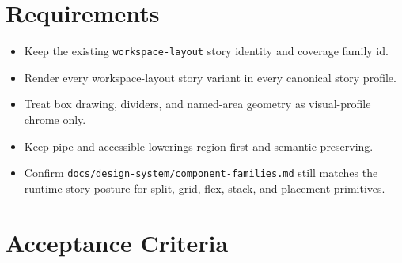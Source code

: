 \section{Requirements}\label{record-106-requirements}

\begin{itemize}
\tightlist
\item
  Keep the existing \texttt{w\allowbreak{}o\allowbreak{}r\allowbreak{}k\allowbreak{}s\allowbreak{}p\allowbreak{}a\allowbreak{}c\allowbreak{}e\allowbreak{}-\allowbreak{}l\allowbreak{}a\allowbreak{}y\allowbreak{}o\allowbreak{}u\allowbreak{}t} story identity and coverage family id.
\item
  Render every workspace-layout story variant in every canonical story profile.
\item
  Treat box drawing, dividers, and named-area geometry as visual-profile chrome only.
\item
  Keep pipe and accessible lowerings region-first and semantic-preserving.
\item
  Confirm \texttt{d\allowbreak{}o\allowbreak{}c\allowbreak{}s\allowbreak{}/\allowbreak{}d\allowbreak{}e\allowbreak{}s\allowbreak{}i\allowbreak{}g\allowbreak{}n\allowbreak{}-\allowbreak{}s\allowbreak{}y\allowbreak{}s\allowbreak{}t\allowbreak{}e\allowbreak{}m\allowbreak{}/\allowbreak{}c\allowbreak{}o\allowbreak{}m\allowbreak{}p\allowbreak{}o\allowbreak{}n\allowbreak{}e\allowbreak{}n\allowbreak{}t\allowbreak{}-\allowbreak{}f\allowbreak{}a\allowbreak{}m\allowbreak{}i\allowbreak{}l\allowbreak{}i\allowbreak{}e\allowbreak{}s\allowbreak{}.\allowbreak{}m\allowbreak{}d} still matches the runtime story posture for split, grid, flex, stack, and placement primitives.
\end{itemize}

\section{Acceptance Criteria}\label{record-106-acceptance-criteria}


